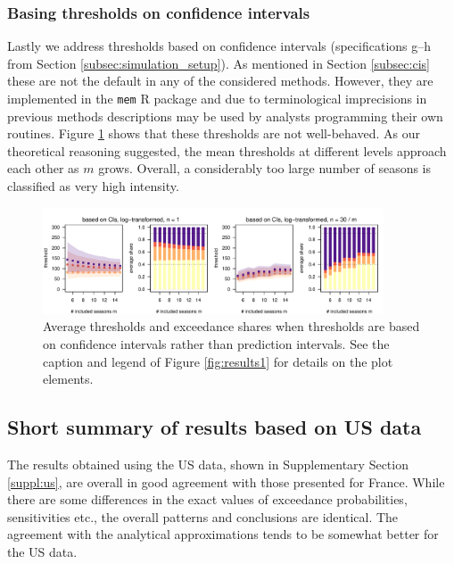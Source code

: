 \documentclass[12pt]{article}
\begin{document}
\subsubsection{Basing thresholds on confidence intervals}

Lastly we address thresholds based on confidence intervals (specifications g--h from Section \ref{subsec:simulation_setup}). As mentioned in Section \ref{subsec:cis} these are not the default in any of the  considered methods. However, they are implemented in the \texttt{mem} R package and due to terminological imprecisions in previous methods descriptions may be used by analysts programming their own routines. Figure \ref{fig:cis} shows that these thresholds are not well-behaved. As our theoretical reasoning suggested, the mean thresholds at different levels approach each other as $m$ grows. Overall, a considerably too large number of seasons is classified as very high intensity.

\begin{figure}[h!]
\begin{center}
\includegraphics[width=0.9\textwidth]{figure/plot_ci_fr.pdf}
\end{center}
\caption{Average thresholds and exceedance shares when thresholds are based on confidence intervals rather than prediction intervals. See the caption and legend of Figure \ref{fig:results1} for details on the plot elements.}
\label{fig:cis}
\end{figure}




\subsection{Short summary of results based on US data}
\label{subsec:results_us}

The results obtained using the US data, shown in Supplementary Section \ref{suppl:us}, are overall in good agreement with those presented for France. While there are some differences in the exact values of exceedance probabilities, sensitivities etc., the overall patterns and conclusions are identical. The agreement with the analytical approximations tends to be somewhat better for the US data. %
\end{document}

